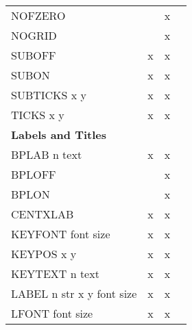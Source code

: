 \begin{center}
\begin{tabular}{lccc}
NOFZERO                          &           &     x  &                    \\
NOGRID                           &           &     x  &                    \\
SUBOFF                           &     x     &     x  &                    \\
SUBON                            &     x     &     x  &                    \\
SUBTICKS  x   y                  &     x     &     x  &                    \\
TICKS  x   y                     &     x     &     x  &                    \\ \hline
%  
{\bf Labels and Titles}          &           &        &                    \\
BPLAB  n   text                  &     x     &     x  &                    \\
BPLOFF                           &           &     x  &                    \\
BPLON                            &           &     x  &                    \\
CENTXLAB                         &     x     &     x  &                    \\
KEYFONT  font   size             &     x     &     x  &                    \\
KEYPOS  x   y                    &     x     &     x  &                    \\
KEYTEXT  n   text                &     x     &     x  &                    \\
LABEL n str x y font size        &     x     &     x  &                    \\
LFONT  font   size               &     x     &     x  &                    \\

\end{tabular}
\end{center}
